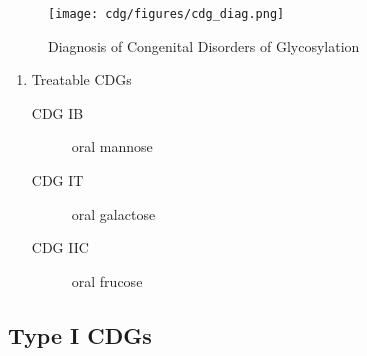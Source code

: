 \documentclass[12pt]{scrartcl}
\begin{document}
\begin{figure}[htbp]
\centering
\texttt{[image: cdg/figures/cdg\_diag.png]}
\caption{\label{fig:org2de9f9a}Diagnosis of Congenital Disorders of Glycosylation}
\end{figure}

\begin{enumerate}
\item Treatable CDGs
\label{sec:org585b45d}
\begin{description}
\item[{CDG IB}] oral mannose
\item[{CDG IT}] oral galactose
\item[{CDG IIC}] oral frucose
\end{description}
\end{enumerate}

\subsection{Type I CDGs}
\label{sec:org6eb3d8a}
\end{document}
